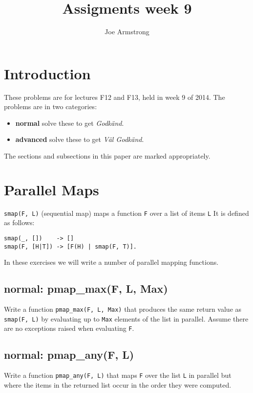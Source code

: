 \documentclass[12pt]{hitec}
\title{Assigments week 9}
\author{Joe Armstrong}
\begin{document}
\maketitle

\tableofcontents

\section{Introduction}

These problems are for lectures F12 and F13, held in week 9 of 2014.
The problems are in two categories:

\begin{itemize}
\item {\bf normal} solve these to get {\sl Godk\"{a}nd}.
\item {\bf advanced} solve these to get {\sl V\"{a}l Godk\"{a}nd}.
\end{itemize}

The sections and subsections in this paper are marked appropriately.

\section{Parallel Maps}

\verb+smap(F, L)+ (sequential map) maps a function \verb+F+ over a
list of items \verb+L+ It is defined as follows:

\begin{Verbatim}
smap(_, [])    -> []
smap(F, [H|T]) -> [F(H) | smap(F, T)].
\end{Verbatim}

In these exercises we will write a number of parallel mapping functions.

\subsection{normal: pmap\_max(F, L, Max)}

Write a function \verb+pmap_max(F, L, Max)+ that produces the same return
value as \verb+smap(F, L)+ by evaluating up to \verb+Max+ elements of the list
in parallel. Assume there are no exceptions raised when evaluating \verb+F+.

\subsection{normal: pmap\_any(F, L)}

Write a function \verb+pmap_any(F, L)+ that maps \verb+F+ over the
list \verb+L+ in parallel but where the items in the returned list
occur in the order they were computed.
\end{document}
